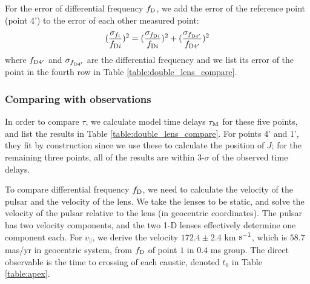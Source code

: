\documentclass[useAMS,usenatbib]{mn2e}
\begin{document}
For the error of differential frequency $f_{\rm D}$, we add the error of the reference point (point 4') to the error of each other measured point:
\begin{equation}
\begin{aligned}
(\frac{\sigma_{f_i}}{f_{{\rm D}i}})^2=(\frac{\sigma_{f_{{\rm D}i}}}{f_{{\rm D}i}})^2+(\frac{\sigma_{f_{{\rm D}4'}}}{f_{{\rm D}4'}})^2
\end{aligned}
\end{equation}
where $f_{{\rm D}4'}$ and $\sigma_{f_{{\rm D}4'}}$ are the differential frequency
and we list its error of the point in the fourth row in Table
\ref{table:double_lens_compare}.

\subsubsection{Comparing with observations}
In order to compare $\tau$, we calculate model time delays $\tau_{\rm M}$ for these five
points, and list the results in Table
\ref{table:double_lens_compare}.  For points 4' and 1', they fit by
construction since we use these to calculate the position of $J$; for the remaining three points, all of the results are within 3-$\sigma$ of the observed time delays.

To compare differential frequency $f_{\rm D}$, we need to calculate the velocity of the pulsar and the velocity of the lens. We take the lenses to be static, and solve the velocity of the pulsar relative to the lens (in geocentric coordinates).  The pulsar has two velocity components, and the two 1-D lenses effectively determine one component each.
For $v_{\parallel}$, we derive the velocity $172.4 \pm 2.4$ km $\rm s^{-1}$, 
which is $58.7$ mas/yr in geocentric system, 
from $f_{\rm D}$ of point $1$ in $0.4$ ms group.  The direct observable is the time to crossing of each caustic, denoted $t_0$ in Table \ref{table:apex}. 
\end{document}
